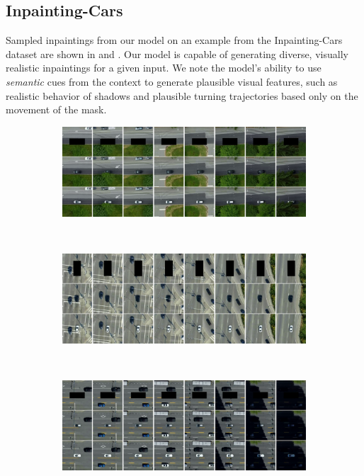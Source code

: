 \subsection{Inpainting-Cars}
Sampled inpaintings from our model on an example from the Inpainting-Cars dataset are shown in  and . Our model is capable of generating diverse, visually realistic inpaintings for a given input. We note the model's ability to use \emph{semantic} cues from the context to generate plausible visual features, such as realistic behavior of shadows and plausible turning trajectories based only on the movement of the mask.

\begin{figure}
    \centering
    \begin{subfigure}{\textwidth}
        \centering
        \includegraphics[width=\textwidth]{figures/additional-samples/cars_3028.pdf}
        \label{fig:extra-cars1}
    \end{subfigure}
    ~
    \begin{subfigure}{\textwidth}
        \centering
        \includegraphics[width=\textwidth]{figures/additional-samples/cars_3067.pdf}
        \label{fig:extra-cars2}
    \end{subfigure}
    ~
    \begin{subfigure}{\textwidth}
        \centering
        \includegraphics[width=\textwidth]{figures/additional-samples/cars_3093.pdf}

\end{subfigure}
\end{figure}
